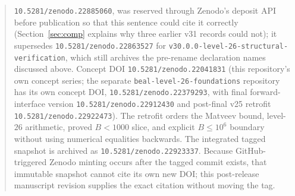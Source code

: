 \documentclass[11pt,reqno]{amsart}
\theoremstyle{definition}
\theoremstyle{remark}
\begin{document}
\begin{abstract}
\texttt{10.5281/zenodo.22885060}, was reserved through Zenodo's
deposit API before publication so that this sentence could cite it
correctly (Section~\ref{sec:comp} explains why three earlier v31
records could not); it supersedes
\texttt{10.5281/zenodo.22863527} for
\texttt{v30.0.0-level-26-structural-verification}, which still
archives the pre-rename declaration names discussed above. Concept
DOI \texttt{10.5281/zenodo.22041831} (this repository's own concept
series; the separate \texttt{beal-level-26-foundations} repository
has its own concept DOI, \texttt{10.5281/zenodo.22379293}, with final
forward-interface version \texttt{10.5281/zenodo.22912430} and post-final
v25 retrofit \texttt{10.5281/zenodo.22922473}). The retrofit orders the
Matveev bound, level-$26$ arithmetic, proved $B<1000$ slice, and explicit
$B\leq10^6$ boundary without using numerical equalities backwards.
The integrated tagged snapshot is archived as
\texttt{10.5281/zenodo.22923337}. Because GitHub-triggered Zenodo minting
occurs after the tagged commit exists, that immutable snapshot cannot cite
its own new DOI; this post-release manuscript revision supplies the exact
citation without moving the tag.
\end{abstract}

\maketitle

\tableofcontents












\end{document}
